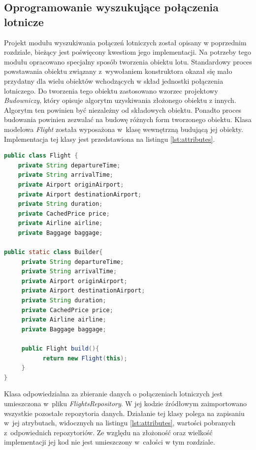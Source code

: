 \documentclass[12pt, twoside]{report}
\begin{document}
\subsection{Oprogramowanie wyszukujące połączenia lotnicze}
Projekt modułu wyszukiwania połączeń lotniczych został opisany w poprzednim rozdziale, bieżący jest poświęcony kwestiom jego implementacji. Na potrzeby tego modułu opracowano specjalny sposób tworzenia obiektu lotu. Standardowy proces powstawania obiektu związany z~wywołaniem konstruktora okazał się mało przydatny dla wielu obiektów wchodzących w skład jednostki połączenia lotniczego. Do tworzenia tego obiektu zastosowano wzorzec projektowy \textit{Budowniczy}, który opisuje algorytm uzyskiwania złożonego obiektu z innych. Algorytm ten powinien być niezależny od składowych obiektu. Ponadto proces budowania powinien zezwalać na budowę różnych form tworzonego obiektu\cite{builder}.
Klasa modelowa \textit{Flight} została wyposażona w~klasę wewnętrzną budującą jej obiekty. Implementacja tej klasy jest przedstawiona na listingu \ref{lst:attributes}.
\begin{lstlisting}[language=java, caption=Fragment klasy Flight, label=lst:attributes]
public class Flight {
    private String departureTime;
    private String arrivalTime;
    private Airport originAirport;
    private Airport destinationAirport;
    private String duration;
    private CachedPrice price;
    private Airline airline;
    private Baggage baggage;
    
public static class Builder{
     private String departureTime;
     private String arrivalTime;
     private Airport originAirport;
     private Airport destinationAirport;
     private String duration;
     private CachedPrice price;
     private Airline airline;
     private Baggage baggage;
        
     public Flight build(){
           return new Flight(this);
     }   
}
\end{lstlisting}
Klasa odpowiedzialna za zbieranie danych o połączeniach lotniczych jest umieszczona w~pliku \textit{FlightsRepository}. W jej kodzie źródłowym zaimportowano wszystkie pozostałe repozytoria danych. 
Działanie tej klasy polega na zapisaniu w~jej atrybutach, widocznych na listingu \ref{lst:attributes}, wartości pobranych z~odpowiednich repozytoriów. Ze względu na złożoność oraz wielkość implementacji jej kod nie jest umieszczony w~całości w tym rozdziale.
\end{document}
